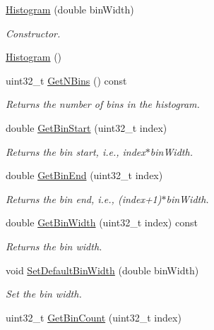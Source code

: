 \begin{DoxyCompactItemize}
\item 
\hyperlink{classns3_1_1Histogram_ac05aafde16936be7156168fef389ff2d}{Histogram} (double bin\+Width)
\begin{DoxyCompactList}\small\item\em Constructor. \end{DoxyCompactList}\item 
\hyperlink{classns3_1_1Histogram_ad1338f0d4e5873b5d27a695bc5a182a0}{Histogram} ()
\item 
uint32\+\_\+t \hyperlink{classns3_1_1Histogram_a1b4fbd85680143421ca221e4529dfcb6}{Get\+N\+Bins} () const 
\begin{DoxyCompactList}\small\item\em Returns the number of bins in the histogram. \end{DoxyCompactList}\item 
double \hyperlink{classns3_1_1Histogram_aa3ae3b4a7ee87cc598d54cdc33e55ee8}{Get\+Bin\+Start} (uint32\+\_\+t index)
\begin{DoxyCompactList}\small\item\em Returns the bin start, i.\+e., index$\ast$bin\+Width. \end{DoxyCompactList}\item 
double \hyperlink{classns3_1_1Histogram_ab70de1f4ad970dc8680ed24c612a3fdd}{Get\+Bin\+End} (uint32\+\_\+t index)
\begin{DoxyCompactList}\small\item\em Returns the bin end, i.\+e., (index+1)$\ast$bin\+Width. \end{DoxyCompactList}\item 
double \hyperlink{classns3_1_1Histogram_a4561599d653c8c09703db0a17dbd5dfc}{Get\+Bin\+Width} (uint32\+\_\+t index) const 
\begin{DoxyCompactList}\small\item\em Returns the bin width. \end{DoxyCompactList}\item 
void \hyperlink{classns3_1_1Histogram_a58d457fa4babedaed2aa64ca3a1bf302}{Set\+Default\+Bin\+Width} (double bin\+Width)
\begin{DoxyCompactList}\small\item\em Set the bin width. \end{DoxyCompactList}\item 
uint32\+\_\+t \hyperlink{classns3_1_1Histogram_a176ac6caa17e6eeec25e4f9f80de14d1}{Get\+Bin\+Count} (uint32\+\_\+t index)

\end{DoxyCompactItemize}
